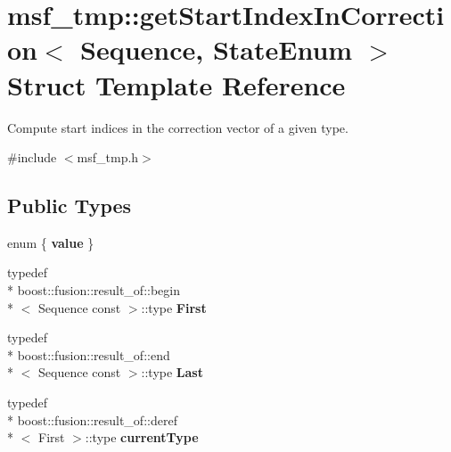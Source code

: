 \hypertarget{structmsf__tmp_1_1getStartIndexInCorrection}{\section{msf\-\_\-tmp\-:\-:get\-Start\-Index\-In\-Correction$<$ Sequence, State\-Enum $>$ Struct Template Reference}
\label{structmsf__tmp_1_1getStartIndexInCorrection}
}


Compute start indices in the correction vector of a given type.  




{\ttfamily \#include $<$msf\-\_\-tmp.\-h$>$}

\subsection*{Public Types}
\begin{DoxyCompactItemize}
\item 
enum \{ {\bfseries value}
 \}
\item 
\hypertarget{structmsf__tmp_1_1getStartIndexInCorrection_a531e307897498c39c16887d82684110e}{typedef \\*
boost\-::fusion\-::result\-\_\-of\-::begin\\*
$<$ Sequence const  $>$\-::type {\bfseries First}}\label{structmsf__tmp_1_1getStartIndexInCorrection_a531e307897498c39c16887d82684110e}

\item 
\hypertarget{structmsf__tmp_1_1getStartIndexInCorrection_a02451eb845fff7f5c3b22f4fc26a5073}{typedef \\*
boost\-::fusion\-::result\-\_\-of\-::end\\*
$<$ Sequence const  $>$\-::type {\bfseries Last}}\label{structmsf__tmp_1_1getStartIndexInCorrection_a02451eb845fff7f5c3b22f4fc26a5073}

\item 
\hypertarget{structmsf__tmp_1_1getStartIndexInCorrection_a9d81c1d4f8ece8ab37f7086a588ca81d}{typedef \\*
boost\-::fusion\-::result\-\_\-of\-::deref\\*
$<$ First $>$\-::type {\bfseries current\-Type}}\label{structmsf__tmp_1_1getStartIndexInCorrection_a9d81c1d4f8ece8ab37f7086a588ca81d}

\end{DoxyCompactItemize}


